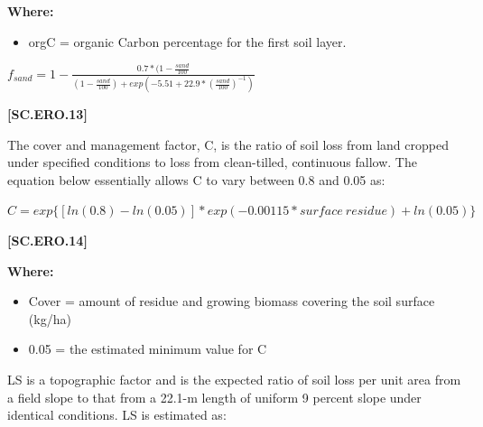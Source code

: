         \textbf{Where:}
            
        \begin{itemize}
            \item orgC	=	organic Carbon percentage for the first soil layer.
        \end{itemize}
            \vspace{0.5cm}

    \begin{center}
 \(f_{sand}=1-\frac{0.7 *(1-\frac{sand}{100}}{(1-\frac{sand}{100})+exp(-5.51+22.9 * (\frac{sand}{100})^{-1})}\)
    \end{center}
        \vspace{0.5cm} 
    
            {\raggedleft \textbf{[SC.ERO.13]}\par}
            \vspace{0.5cm}

The cover and management factor, C, is the ratio of soil loss from land cropped under specified conditions to loss from clean-tilled, continuous fallow. The equation below essentially allows C to vary between 0.8 and 0.05 as:
            \vspace{0.5cm}

    \begin{center}
 \(C=exp\{[ln(0.8)-ln(0.05)] * exp(-0.00115*surface\ residue)+ln(0.05)\}\)
    \end{center}
        \vspace{0.5cm} 
    
            {\raggedleft \textbf{[SC.ERO.14]}\par}
            \vspace{0.5cm}

        \textbf{Where:}
            
        \begin{itemize}
            \item Cover	=	amount of residue and growing biomass covering the soil surface (kg/ha)
            \item 0.05	=	the estimated minimum value for C	
        \end{itemize}
    \vspace{0.2cm}

LS is a topographic factor and is the expected ratio of soil loss per unit area from a field slope to that from a 22.1-m length of uniform 9 percent slope under identical conditions. LS is estimated as:
            \vspace{0.5cm}
            
